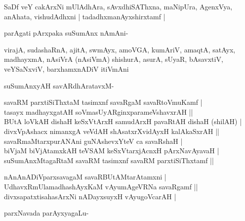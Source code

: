 SaDf veY cakArxNi mUlAdhAra, sAvxdhiSAThxna, maNipUra, AgenxVya, anAhata, vishudAdhxni | tadadhxmanAyxshirxtamf |

parAgati pArxpaka suSumAnx nAmAni-

virajA, sudashaRnA, ajitA, swmAyx, amoVGA, kumAriV, amaqtA, satAyx, madhayxmA, nAsiVrA (nAsiVmA) shishurA, asurA, sUyaR, bAsavxtiV, veYSaNxviV, barxhamxnADiV itiVmAni

suSumAnxyAH savARdhAratavxM-

\begin{shloka}
savaRM parxtiSiThxtaM tasimxnf savaRgaM savaRtoVmuKamf |\\
tasayx madhayxgatAH soVmasUyARginxparameVshavxrAH ||\\
BUtA loVkAH dishaH keSxVtArxH samudArxH pavaRtAH dishaH (shilAH) |\\
divxVpAshacx nimanxgA veVdAH shAsatxrXvidAyxH kalAkaSxrAH ||\\
savaRmaMtarxpurANAni guNAshevxYteV ca savaRshaH |\\
biVjaM biVjAtamxkAH teVSAM keSxVtarxjAcnxH pArxNavAyavaH |\\
suSumAnxMtagaRtaM savaRM tasimxnf savaRM parxtiSiThxtamf ||
\end{shloka}

\begin{shloka}
nAnAnADiVparxsavagaM savaRBUtAMtarAtamxni |\\
UdhavxRmUlamadhashAyxKaM vAyumAgeVRNa savaRgamf ||\\
divxsapatxtisahasArxNi nADayxsuyxH vAyugoVcarAH |
\end{shloka}

parxNavada parAyxyagaLu-

